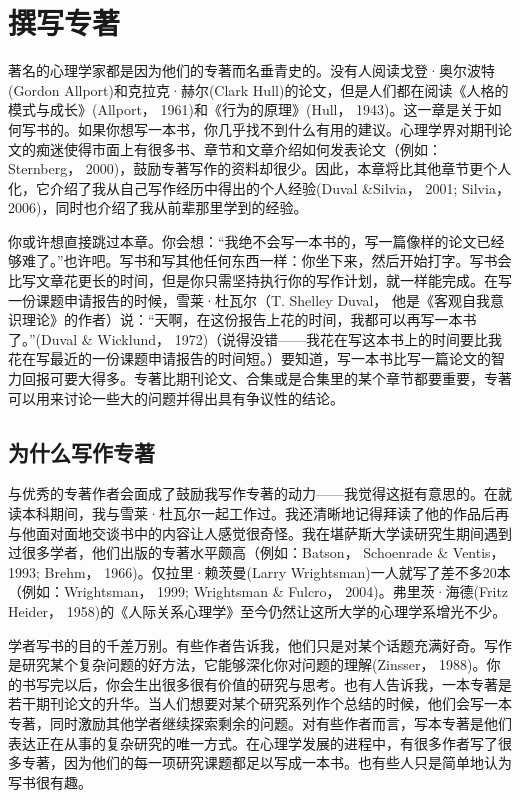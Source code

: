 \chapter{撰写专著}
著名的心理学家都是因为他们的专著而名垂青史的。没有人阅读戈登·奥尔波特(Gordon Allport)和克拉克·赫尔(Clark Hull)的论文，但是人们都在阅读《人格的模式与成长》(Allport， 1961)和《行为的原理》(Hull， 1943)。这一章是关于如何写书的。如果你想写一本书，你几乎找不到什么有用的建议。心理学界对期刊论文的痴迷使得市面上有很多书、章节和文章介绍如何发表论文（例如：Sternberg， 2000)，鼓励专著写作的资料却很少。因此，本章将比其他章节更个人化，它介绍了我从自己写作经历中得出的个人经验(Duval \&Silvia， 2001; Silvia， 2006)，同时也介绍了我从前辈那里学到的经验。

你或许想直接跳过本章。你会想：“我绝不会写一本书的，写一篇像样的论文已经够难了。”也许吧。写书和写其他任何东西一样：你坐下来，然后开始打字。写书会比写文章花更长的时间，但是你只需坚持执行你的写作计划，就一样能完成。在写一份课题申请报告的时候，雪莱·杜瓦尔（T. Shelley Duval， 他是《客观自我意识理论》的作者）说：“天啊，在这份报告上花的时间，我都可以再写一本书了。”(Duval \& Wicklund， 1972)（说得没错——我花在写这本书上的时间要比我花在写最近的一份课题申请报告的时间短。）要知道，写一本书比写一篇论文的智力回报可要大得多。专著比期刊论文、合集或是合集里的某个章节都要重要，专著可以用来讨论一些大的问题并得出具有争议性的结论。

\section{为什么写作专著}
与优秀的专著作者会面成了鼓励我写作专著的动力——我觉得这挺有意思的。在就读本科期间，我与雪莱·杜瓦尔一起工作过。我还清晰地记得拜读了他的作品后再与他面对面地交谈书中的内容让人感觉很奇怪。我在堪萨斯大学读研究生期间遇到过很多学者，他们出版的专著水平颇高（例如：Batson， Schoenrade \& Ventis， 1993; Brehm， 1966)。仅拉里·赖茨曼(Larry Wrightsman)一人就写了差不多20本（例如：Wrightsman， 1999; Wrightsman \& Fulcro， 2004)。弗里茨·海德(Fritz Heider， 1958)的《人际关系心理学》至今仍然让这所大学的心理学系增光不少。

学者写书的目的千差万别。有些作者告诉我，他们只是对某个话题充满好奇。写作是研究某个复杂问题的好方法，它能够深化你对问题的理解(Zinsser， 1988)。你的书写完以后，你会生出很多很有价值的研究与思考。也有人告诉我，一本专著是若干期刊论文的升华。当人们想要对某个研究系列作个总结的时候，他们会写一本专著，同时激励其他学者继续探索剩余的问题。对有些作者而言，写本专著是他们表达正在从事的复杂研究的唯一方式。在心理学发展的进程中，有很多作者写了很多专著，因为他们的每一项研究课题都足以写成一本书。也有些人只是简单地认为写书很有趣。

